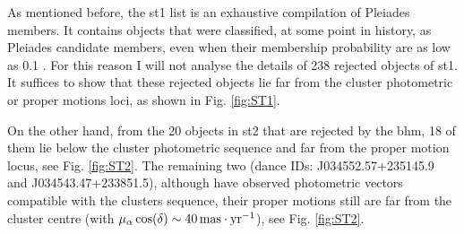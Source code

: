 As mentioned before, the \gls{st1} list is an exhaustive compilation of Pleiades members. It contains objects that were classified, at some point in history, as Pleiades candidate members, even when their membership probability are as low as 0.1 \citep{Stauffer2007}. For this reason I will not analyse the details of 238 rejected objects of \gls{st1}. It suffices to show that these rejected objects lie far from the cluster photometric or proper motions loci, as shown in Fig. \ref{fig:ST1}.

On the other hand, from the 20 objects in \gls{st2} that are rejected by the \gls{bhm}, 18 of them lie below the cluster photometric sequence and far from the proper motion locus, see Fig. \ref{fig:ST2}. The remaining two (\gls{dance} IDs: J034552.57+235145.9 and J034543.47+233851.5), although have observed photometric vectors compatible with the clusters sequence, their proper motions still are far from the cluster centre (with $\mu_{\alpha}\cos(\delta)\sim 40\,\rm{mas\cdot yr^{-1}}$), see Fig. \ref{fig:ST2}.


